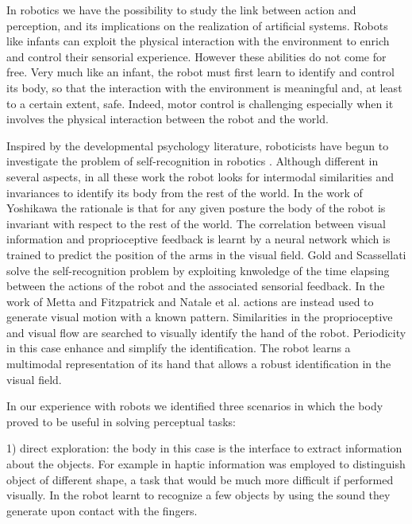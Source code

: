 In robotics we have the possibility to study the link between action and perception, and its implications on the realization of artificial systems. Robots like infants can exploit the physical interaction with the environment to enrich and control their sensorial experience. However these abilities do not come for free. Very much like an infant, the robot must first learn to identify and control its body, so that the interaction with the environment is meaningful and, at least to a certain extent, safe. Indeed, motor control is challenging especially when it involves the physical interaction between the robot and the world. 

Inspired by the developmental psychology literature, roboticists have begun to investigate the problem of self-recognition in robotics \cite{yoshikawa03doestheinvariance,metta03early,natale05exploring,gold05learning}. Although different in several aspects, in all these work the robot looks for intermodal similarities and invariances to identify its body from the rest of the world.
In the work of Yoshikawa \cite{yoshikawa03doestheinvariance} the rationale is that for any given posture the body of the robot is invariant with respect to the rest of the world. The correlation between visual information and proprioceptive feedback is learnt by a neural network which is trained to predict the position of the arms in the visual field.
Gold and Scassellati \cite{gold05learning} solve the self-recognition problem by exploiting knwoledge of the time elapsing between the actions of the robot and the associated sensorial feedback.
In the work of Metta and Fitzpatrick \cite{metta03early} and Natale et al. \cite{natale05exploring} actions are instead used to generate visual motion with a known pattern. Similarities in the proprioceptive and visual flow are searched to visually identify the hand of the robot. Periodicity in this case enhance and simplify the identification. The robot learns a multimodal representation of its hand that allows a robust identification in the visual field.

In our experience with robots we identified three scenarios in which the body proved to be useful in solving perceptual tasks:

1) direct exploration: the body in this case is the interface to extract information about the objects. For example in \cite{natale04learning} haptic information was employed to distinguish object of different shape, a task that would be much more difficult if performed visually. In \cite{torres-jara05tapping} the robot learnt to recognize a few objects by using the sound they generate upon contact with the fingers.

